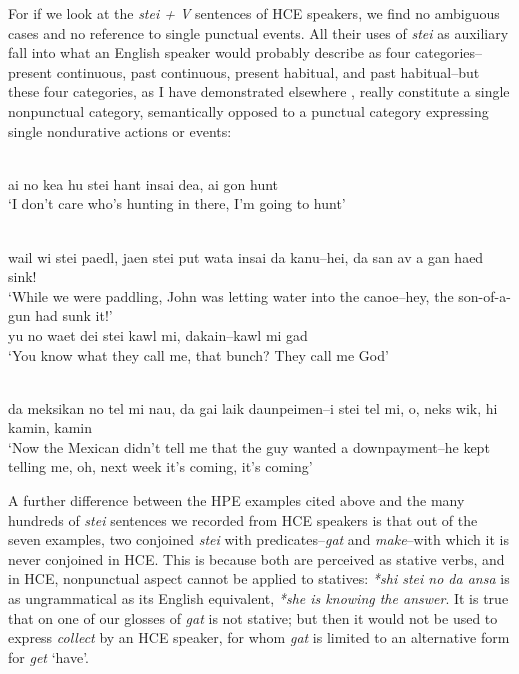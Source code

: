For if we look at the \textit{stei + V} sentences of HCE speakers, we find no ambiguous cases and no reference to single punctual events. All their uses of \textit{stei} as auxiliary fall into what an English speaker would probably describe as four categories--present continuous, past con\-tinuous, present habitual, and past habitual--but these four categories, as I have demonstrated elsewhere \citep[Chapter 2]{Bickerton1975}, really constitute a single nonpunctual category, semantically opposed to a punctual category expressing single nondurative actions or events:

\ea\label{ex:52}
\\
ai no kea hu stei hant insai dea, ai gon hunt \\
\glt `I don't care who's hunting in there, I'm going to hunt'
\z

\ea\label{ex:53}
\\
wail wi stei paedl, jaen stei put wata insai da kanu--hei, da san av a gan haed sink!\\
\glt `While we were paddling, John was letting water into the canoe--hey, the son-of-a-gun had sunk it!'
\z
\ea\label{ex:54}
 \\
 yu no waet dei stei kawl mi, dakain--kawl mi gad\\
\glt `You know what they call me, that bunch? They call me God'
\z

\ea\label{ex:55}
\\
da meksikan no tel mi nau, da gai laik daunpeimen--i stei tel mi, o, neks wik, hi kamin, kamin\\
\glt `Now the Mexican didn't tell me that the guy wanted a down\-payment--he kept telling me, oh, next week it's coming, it's coming'
\z

A further difference between the HPE examples cited above and the many hundreds of \textit{stei} sentences we recorded from HCE speakers is that out of the seven examples, two conjoined \textit{stei} with predicates--\textit{gat} and \textit{make}--with which it is never conjoined in HCE. This is because both are perceived as stative verbs, and in HCE, nonpunctual aspect cannot be applied to statives: \textit{*shi stei no da ansa} is as ungrammatical as its English equivalent, \textit{*she is knowing the answer}. It is true that on one of our glosses of  \textit{gat} is not stative; but then it would not be used to express \textit{collect} by an HCE speaker, for whom \textit{gat} is limited to an alternative form for \textit{get} `have'.

